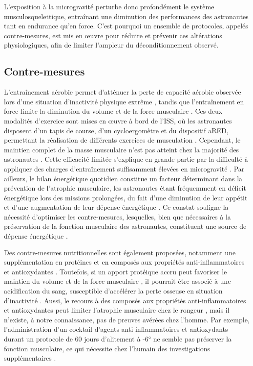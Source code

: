 \documentclass[11pt]{report}
\begin{document}
\medskip L'exposition à la microgravité perturbe donc profondément le système musculosquelettique, entraînant une diminution des performances des astronautes tant en endurance qu'en force. C'est pourquoi un ensemble de protocoles, appelés contre-mesures, est mis en œuvre pour réduire et prévenir ces altérations physiologiques, afin de limiter l'ampleur du déconditionnement observé.

\subsection{Contre-mesures}
\label{subsec:contremes}

L'entraînement aérobie permet d'atténuer la perte de capacité aérobie observée lors d'une situation d'inactivité physique extrême \parencite{Cotter2024Sep,Shibata2010May}, tandis que l'entraînement en force limite la diminution du volume et de la force musculaire \parencite{guo_resistance_2025}. Ces deux modalités d'exercice sont mises en œuvre à bord de l'ISS, où les astronautes disposent d'un tapis de course, d'un cycloergomètre et du dispositif aRED, permettant la réalisation de différents exercices de musculation \parencite{Petersen2016Aug}. Cependant, le maintien complet de la masse musculaire n'est pas atteint chez la majorité des astronautes \parencite{bosutti_microgravity-induced_2025}. Cette efficacité limitée s'explique en grande partie par la difficulté à appliquer des charges d'entraînement suffisamment élevées en microgravité \parencite{Rittweger2018Sep}. Par ailleurs, le bilan énergétique quotidien constitue un facteur déterminant dans la prévention de l'atrophie musculaire, les astronautes étant fréquemment en déficit énergétique lors des missions prolongées, du fait d'une diminution de leur appétit et d'une augmentation de leur dépense énergétique \parencite{bosutti_microgravity-induced_2025, Pittia2023Dec}. Ce constat souligne la nécessité d'optimiser les contre-mesures, lesquelles, bien que nécessaires à la préservation de la fonction musculaire des astronautes, constituent une source de dépense énergétique \parencite{Laurens2019Mar}.

Des contre-mesures nutritionnelles sont également proposées, notamment une supplémentation en protéines et en composés aux propriétés anti-inflammatoires et antioxydantes \parencite{bosutti_microgravity-induced_2025}. Toutefois, si un apport protéique accru peut favoriser le maintien du volume et de la force musculaire \parencite{Stein2011Oct}, il pourrait être associé à une acidification du sang, susceptible d'accélérer la perte osseuse en situation d'inactivité \parencite{Zwart2005Jul}. Aussi, le recours à des composés aux propriétés anti-inflammatoires et antioxydantes peut limiter l'atrophie musculaire chez le rongeur \parencite{Servais2007Mar,Momken2011Oct,Derbre2012,Ferrando2018Feb}, mais il n'existe, à notre connaissance, pas de preuves avérées chez l'homme. Par exemple, l'administration d'un cocktail d'agents anti-inflammatoires et antioxydants durant un protocole de 60 jours d'alitement à -6° ne semble pas préserver la fonction musculaire, ce qui nécessite chez l'humain des investigations supplémentaires \parencite{Arc-Chagnaud2020Feb}. 
\end{document}
